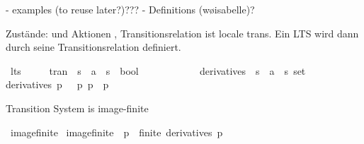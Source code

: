 \begin{isabellebody}
\begin{isamarkuptext}
- examples (to reuse later?)???
- Definitions (w\o isabelle)?%
\end{isamarkuptext}\isamarkuptrue%
%
\isadelimdocument
%
\endisadelimdocument
%
\isatagdocument
%
\isamarkuptrue%
%
\endisatagdocument
{\isafolddocument}%
%
\isadelimdocument
%
\endisadelimdocument
%
\begin{isamarkuptext}%
Zustände:  und Aktionen , Transitionsrelation ist locale trans. Ein LTS wird dann durch
seine Transitionsrelation definiert.%
\end{isamarkuptext}\isamarkuptrue%
\isamarkupfalse%
\ lts\ {\isacharequal}{\kern0pt}\ \isanewline
\ \ \ tran\ {\isacharcolon}{\kern0pt}{\isacharcolon}{\kern0pt}\ {\isacartoucheopen}{\isacharprime}{\kern0pt}s\ {\isasymRightarrow}\ {\isacharprime}{\kern0pt}a\ {\isasymRightarrow}\ {\isacharprime}{\kern0pt}s\ {\isasymRightarrow}\ bool{\isacartoucheclose}\isanewline
\ \ \ \ {\isacharparenleft}{\kern0pt}{\isachardoublequoteopen}{\isacharunderscore}{\kern0pt}\ {\isasymmapsto}{\isacharunderscore}{\kern0pt}\ {\isacharunderscore}{\kern0pt}{\isachardoublequoteclose}\ {\isacharbrackleft}{\kern0pt}{}{}{\isacharcomma}{\kern0pt}\ {}{}{\isacharcomma}{\kern0pt}\ {}{}{\isacharbrackright}{\kern0pt}\ {}{}{\isacharparenright}{\kern0pt}\isanewline
{}\isanewline
\isanewline
{}\isamarkupfalse%
\ derivatives\ {\isacharcolon}{\kern0pt}{\isacharcolon}{\kern0pt}\ {\isacartoucheopen}{\isacharprime}{\kern0pt}s\ {\isasymRightarrow}\ {\isacharprime}{\kern0pt}a\ {\isasymRightarrow}\ {\isacharprime}{\kern0pt}s\ set{\isacartoucheclose}\isanewline
\ \ \isanewline
{\isacartoucheopen}derivatives\ p\ {\isasymalpha}\ {\isasymequiv}\ {\isacharbraceleft}{\kern0pt}p{\isacharprime}{\kern0pt}{\isachardot}{\kern0pt}\ p\ {\isasymmapsto}{\isasymalpha}\ p{\isacharprime}{\kern0pt}{\isacharbraceright}{\kern0pt}{\isacartoucheclose}%
\begin{isamarkuptext}%
Transition System is image-finite%
\end{isamarkuptext}\isamarkuptrue%
\isamarkupfalse%
\ image{\isacharunderscore}{\kern0pt}finite\ \isanewline
{\isacartoucheopen}image{\isacharunderscore}{\kern0pt}finite\ {\isasymequiv}\ {\isacharparenleft}{\kern0pt}{\isasymforall}p\ {\isasymalpha}{\isachardot}{\kern0pt}\ finite\ {\isacharparenleft}{\kern0pt}derivatives\ p\ {\isasymalpha}{\isacharparenright}{\kern0pt}{\isacharparenright}{\kern0pt}{\isacartoucheclose}\isanewline

\end{isabellebody}
